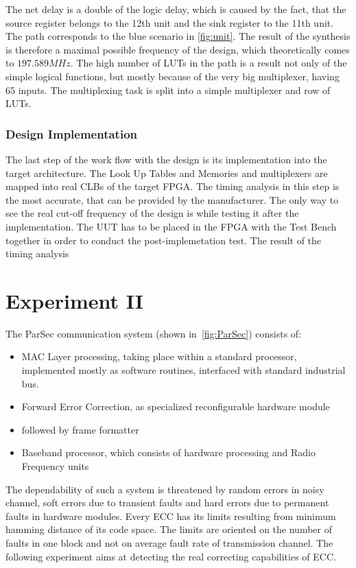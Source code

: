 The net delay is a double of the logic delay, which is caused by the fact, that the source register belongs to the 12th unit and the sink register to the 11th unit. The path corresponds to the blue scenario in \autoref{fig:unit}. The result of the synthesis is therefore a maximal possible frequency of the design, which theoretically comes to $197.589 MHz$. The high number of LUTs in the path is a result not only of the simple logical functions, but mostly because of the very big multiplexer, having 65 inputs. The multiplexing task is split into a simple multiplexer and row of LUTs.

\subsection{Design Implementation}
The last step of the work flow with the design is its implementation into the target architecture. The Look Up Tables and Memories and multiplexers are mapped into real CLBs of the target FPGA. The timing analysis in this step is the most accurate, that can be provided by the manufacturer. The only way to see the real cut-off frequency of the design is while testing it after the implementation. The UUT has to be placed in the FPGA with the Test Bench together in order to conduct the post-implemetation test. The result of the timing analysis 

\chapter{Experiment II}

The ParSec communication system (shown in~\autoref{fig:ParSec}) consists of:
\begin{itemize}
    \item MAC Layer processing, taking place within a standard processor, implemented mostly as software routines, interfaced with standard industrial bus.
    \item Forward Error Correction, as specialized reconfigurable hardware module
    \item followed by frame formatter
    \item Baseband processor, which consists of hardware processing and Radio Frequency units
\end{itemize}
The dependability of such a system is threatened by random errors in noisy channel, soft errors due to transient faults and hard errors due to permanent faults in hardware modules. Every ECC has its limits resulting from minimum hamming distance of its code space. The limits are oriented on the number of faults in one block and not on average fault rate of transmission channel. The following experiment aims at detecting the real correcting capabilities of ECC.
